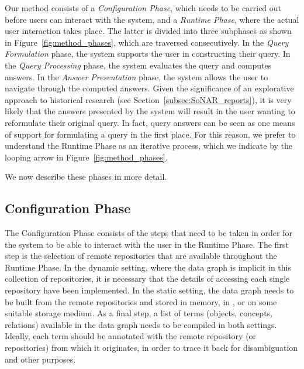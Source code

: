 Our method consists of a \emph{Configuration Phase}, which
needs to be carried out before users can interact with the system,
and a \emph{Runtime Phase}, where the actual user interaction takes place.
The latter is divided into three subphases as shown in Figure~\ref{fig:method_phases},
which are traversed consecutively.
In the \emph{Query Formulation} phase, the system supports the user 
in constructing their query.
In the \emph{Query Processing} phase, the system evaluates the query
and computes answers.
In the \emph{Answer Presentation} phase, the system allows the user to
navigate through the computed answers.
Given the significance of an explorative approach to historical research
(see Section~\ref{subsec:SoNAR_reports}),
it is very likely that the answers presented by the system will 
result in the user wanting to reformulate their original query.
In fact, query answers can be seen as one means of support
for formulating a query in the first place.
For this reason, we prefer to understand the Runtime Phase as an iterative process,
which we indicate by the looping arrow in Figure~\ref{fig:method_phases}.

We now describe these phases in more detail.

\subsection{Configuration Phase}
\label{subsec:configuration_phase}

The Configuration Phase consists of the steps that need to be taken
in order for the system to be able to interact with the user in the Runtime Phase.
The first step is the selection of remote repositories that are available 
throughout the Runtime Phase.
In the dynamic setting, where the data graph is implicit in this collection of repositories,
it is necessary that the details of accessing each single repository
have been implemented.
In the static setting, the data graph needs to be built from the remote repositories
and stored in memory, in , or on some suitable storage medium.
As a final step, a list of terms (objects, concepts, relations) available in the data graph
needs to be compiled in both settings. Ideally, each term should be annotated with the remote repository
(or repositories)
from which it originates, in order to trace it back for disambiguation and
other purposes.

